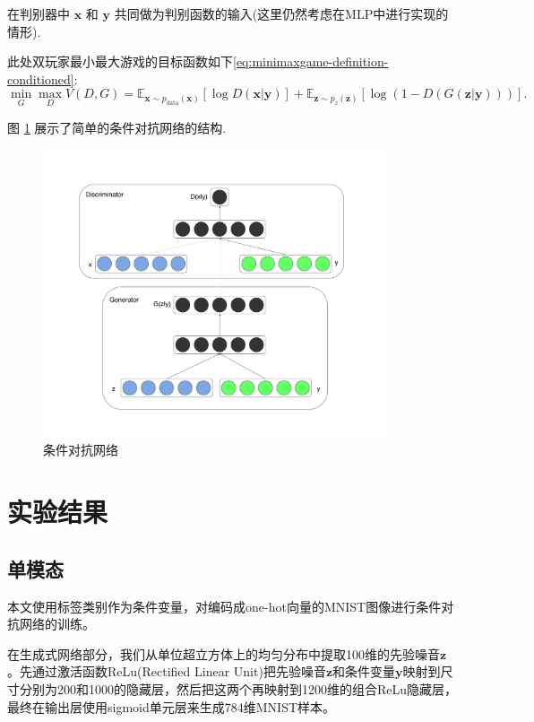 \documentclass{article} %
\begin{document}
在判别器中 ${\bm{x}}$ 和 ${\bm{y}}$ 共同做为判别函数的输入(这里仍然考虑在MLP中进行实现的情形).

此处双玩家最小最大游戏的目标函数如下\ref{eq:minimaxgame-definition-conditioned}:
\begin{equation}
\label{eq:minimaxgame-definition-conditioned}
\min_G \max_D V(D, G) = \mathbb{E}_{\bm{x} \sim p_{\text{data}}(\bm{x})}[\log D(\bm{x} | \bm{y})] + \mathbb{E}_{\bm{z} \sim p_z(\bm{z})}[\log (1 - D(G(\bm{z} | \bm{y})))].
\end{equation}

图 \ref{fig:diagram} 展示了简单的条件对抗网络的结构.

\begin{figure}[h]
\centering
    \includegraphics[width=0.9\textwidth]{diagram.pdf}
    \caption{\small 条件对抗网络}
\label{fig:diagram}
\end{figure}


\section{实验结果}
\subsection{单模态}

本文使用标签类别作为条件变量，对编码成one-hot向量的MNIST图像进行条件对抗网络的训练。

在生成式网络部分，我们从单位超立方体上的均匀分布中提取100维的先验噪音${\bm{z}}$。先通过激活函数ReLu(Rectified Linear Unit)\cite{glorot2011deep, Jarrett-ICCV2009-small}把先验噪音${\bm{z}}$和条件变量${\bm{y}}$映射到尺寸分别为200和1000的隐藏层，然后把这两个再映射到1200维的组合ReLu隐藏层，最终在输出层使用sigmoid单元层来生成784维MNIST样本。
\end{document}
